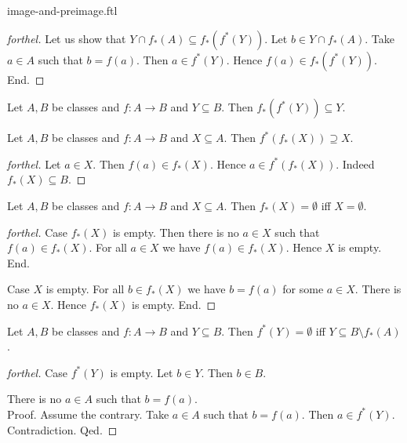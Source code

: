 \documentclass{naproche-library}
\begin{document}
\begin{smodule}{image-and-preimage.ftl}
\begin{proof}[forthel]
    Let us show that $Y \cap f_{*}(A) \subseteq f_{*}(f^{*}(Y))$.
      Let $b \in Y \cap f_{*}(A)$.
      Take $a \in A$ such that $b = f(a)$.
      Then $a \in f^{*}(Y)$.
      Hence $f(a) \in f_{*}(f^{*}(Y))$.
    End.
  \end{proof}

  \begin{corollary}[forthel,id=FOUNDATIONS_07_5585105345052672,printid]
    Let $A, B$ be classes and $f : A \to B$ and $Y \subseteq B$.
    Then $f_{*}(f^{*}(Y)) \subseteq Y$.
  \end{corollary}

  \begin{proposition}[forthel,id=FOUNDATIONS_07_4890896170483712,printid]
    Let $A, B$ be classes and $f : A \to B$ and $X \subseteq A$.
    Then $f^{*}(f_{*}(X)) \supseteq X$.
  \end{proposition}
  \begin{proof}[forthel]
    Let $a \in X$.
    Then $f(a) \in f_{*}(X)$.
    Hence $a \in f^{*}(f_{*}(X))$.
    Indeed $f_{*}(X) \subseteq B$.
  \end{proof}

  \begin{proposition}[forthel,id=FOUNDATIONS_07_3318372355801088,printid]
    Let $A, B$ be classes and $f : A \to B$ and $X \subseteq A$.
    Then $f_{*}(X) = \emptyset$ iff $X = \emptyset$.
  \end{proposition}
  \begin{proof}[forthel]
    Case $f_{*}(X)$ is empty.
      Then there is no $a \in X$ such that $f(a) \in f_{*}(X)$.
      For all $a \in X$ we have $f(a) \in f_{*}(X)$.
      Hence $X$ is empty.
    End.

    Case $X$ is empty.
      For all $b \in f_{*}(X)$ we have $b = f(a)$ for some $a \in X$.
      There is no $a \in X$.
      Hence $f_{*}(X)$ is empty.
    End.
  \end{proof}

  \begin{proposition}[forthel,id=FOUNDATIONS_07_8597874786959360,printid]
    Let $A, B$ be classes and $f : A \to B$ and $Y \subseteq B$.
    Then $f^{*}(Y) = \emptyset$ iff $Y \subseteq B \setminus f_{*}(A)$.
  \end{proposition}
  \begin{proof}[forthel]
    Case $f^{*}(Y)$ is empty.
      Let $b \in Y$.
      Then $b \in B$.

      There is no $a \in A$ such that $b = f(a)$. \\
      Proof.
        Assume the contrary.
        Take $a \in A$ such that $b = f(a)$.
        Then $a \in f^{*}(Y)$.
        Contradiction.
      Qed.


\end{proof}
\end{smodule}
\end{document}
